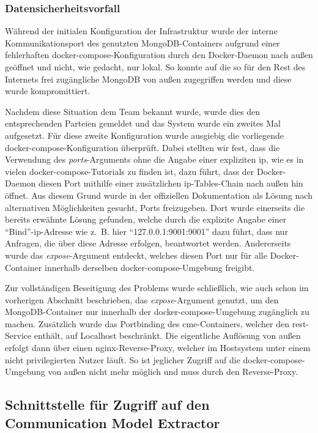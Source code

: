 \subsubsection{Datensicherheitsvorfall}

Während der initialen Konfiguration der Infrastruktur wurde der interne
Kommunikationsport des genutzten MongoDB-Containers aufgrund einer
fehlerhaften docker-compose-Konfiguration durch den Docker-Daemon nach außen
geöffnet und nicht, wie gedacht, nur lokal. So konnte auf die so für den Rest
des Internets frei zugängliche MongoDB von außen zugegriffen werden und diese
wurde kompromittiert.

Nachdem diese Situation dem Team bekannt wurde, wurde dies den entsprechenden
Parteien gemeldet und das System wurde ein zweites Mal aufgesetzt. Für diese
zweite Konfiguration wurde ausgiebig die vorliegende
docker-compose-Konfiguration überprüft. Dabei stellten wir fest, dass die
Verwendung des \textit{ports}-Arguments ohne die Angabe einer expliziten \gls{ip},
wie es in vielen docker-compose-Tutorials zu finden ist, dazu führt, dass der
Docker-Daemon diesen Port mithilfe einer zusätzlichen \gls{ip}-Tables-Chain nach
außen hin öffnet. Aus diesem Grund wurde in der offiziellen Dokumentation als
Lösung nach alternativen Möglichkeiten gesucht, Ports freizugeben. Dort wurde
einerseits die bereits erwähnte Lösung gefunden, welche durch die explizite
Angabe einer \enquote{Bind}-\gls{ip}-Adresse wie z.~B. hier
\enquote{127.0.0.1:9001:9001} dazu führt, dass nur Anfragen, die über diese
Adresse erfolgen, beantwortet werden. Andererseits wurde das
\textit{expose}-Argument entdeckt, welches diesen Port nur für alle
Docker-Container innerhalb derselben docker-compose-Umgebung freigibt.

Zur vollständigen Beseitigung des Problems wurde schließlich, wie auch schon
im vorherigen Abschnitt beschrieben, das \textit{expose}-Argument genutzt,
um den MongoDB-Container nur innerhalb der docker-compose-Umgebung zugänglich
zu machen. Zusätzlich wurde das Portbinding des \gls{cme}-Containers, welcher
den \gls{rest}-Service enthält, auf Localhost beschränkt. Die eigentliche
Auflösung von außen erfolgt dann über einen nginx-Reverse-Proxy, welcher im
Hostsystem unter einem nicht privilegierten Nutzer läuft. So ist jeglicher
Zugriff auf die docker-compose-Umgebung von außen nicht mehr möglich und muss
durch den Reverse-Proxy.

\subsection{Schnittstelle für Zugriff auf den Communication Model Extractor}


